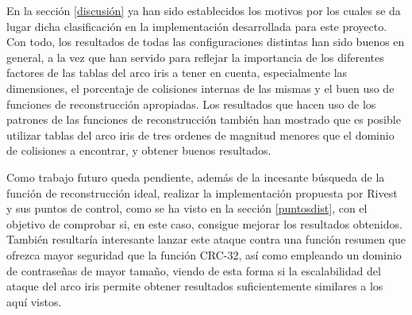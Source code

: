 \documentclass[12pt,spanish,listoffigures,listoftables,listofalgorithms]{tfgetsinf}
\begin{document}
En la sección \ref{discusión} ya han sido establecidos los motivos por los cuales se da lugar dicha clasificación en la implementación desarrollada para este proyecto. Con todo, los resultados de todas las configuraciones distintas han sido buenos en general, a la vez que han servido para reflejar la importancia de los diferentes factores de las tablas del arco iris a tener en cuenta, especialmente las dimensiones, el porcentaje de colisiones internas de las mismas y el buen uso de funciones de reconstrucción apropiadas. Los resultados que hacen uso de los patrones de las funciones de reconstrucción también han mostrado que es posible utilizar tablas del arco iris de tres ordenes de magnitud menores que el dominio de colisiones a encontrar, y obtener buenos resultados.

Como trabajo futuro queda pendiente, además de la incesante búsqueda de la función de reconstrucción ideal, realizar la implementación propuesta por Rivest \cite{rivest} y sus puntos de control, como se ha visto en la sección \ref{puntosdist}, con el objetivo de comprobar si, en este caso, consigue mejorar los resultados obtenidos. También resultaría interesante lanzar este ataque contra una función resumen que ofrezca mayor seguridad que la función CRC-32, así como empleando un dominio de contraseñas de mayor tamaño, viendo de esta forma si la escalabilidad del ataque del arco iris permite obtener resultados suficientemente similares a los aquí vistos.
\end{document}
